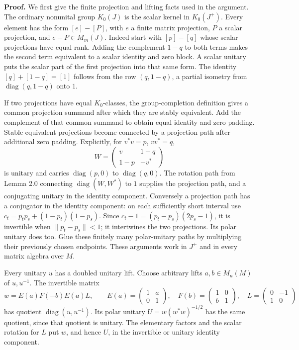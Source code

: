 \documentclass[
  11pt,
]{article}
\begin{document}
\textbf{Proof.} We first give the finite projection and lifting facts
used in the argument. The ordinary nonunital group \(K_0(J)\) is the
scalar kernel in \(K_0(J^+)\). Every element has the form \([e]-[P]\),
with \(e\) a finite matrix projection, \(P\) a scalar projection, and
\(e-P\in M_m(J)\). Indeed start with \([p]-[q]\) whose scalar
projections have equal rank. Adding the complement \(1-q\) to both terms
makes the second term equivalent to a scalar identity and zero block. A
scalar unitary puts the scalar part of the first projection into that
same form. The identity \([q]+[1-q]=[1]\) follows from the row
\((q,1-q)\), a partial isometry from \(\operatorname{diag}(q,1-q)\) onto
\(1\).

If two projections have equal \(K_0\)-classes, the group-completion
definition gives a common projection summand after which they are stably
equivalent. Add the complement of that common summand to obtain equal
identity and zero padding. Stable equivalent projections become
connected by a projection path after additional zero padding.
Explicitly, for \(v^*v=p\), \(vv^*=q\), \[
W=\begin{pmatrix}v&1-q\\1-p&-v^*\end{pmatrix}
\] is unitary and carries \(\operatorname{diag}(p,0)\) to
\(\operatorname{diag}(q,0)\). The rotation path from Lemma 2.0
connecting \(\operatorname{diag}(W,W^*)\) to \(1\) supplies the
projection path, and a conjugating unitary in the identity component.
Conversely a projection path has a conjugator in the identity component:
on each sufficiently short interval use \(c_t=p_t p_s+(1-p_t)(1-p_s)\).
Since \(c_t-1=(p_t-p_s)(2p_s-1)\), it is invertible when
\(\|p_t-p_s\|<1\); it intertwines the two projections. Its polar unitary
does too. Glue these finitely many polar-unitary paths by multiplying
their previously chosen endpoints. These arguments work in \(J^+\) and
in every matrix algebra over \(M\).

Every unitary \(u\) has a doubled unitary lift. Choose arbitrary lifts
\(a,b\in M_n(M)\) of \(u,u^{-1}\). The invertible matrix \[
w=E(a)F(-b)E(a)L,\qquad
E(a)=\begin{pmatrix}1&a\\0&1\end{pmatrix},\quad
F(b)=\begin{pmatrix}1&0\\b&1\end{pmatrix},\quad
L=\begin{pmatrix}0&-1\\1&0\end{pmatrix}
\] has quotient \(\operatorname{diag}(u,u^{-1})\). Its polar unitary
\(U=w(w^*w)^{-1/2}\) has the same quotient, since that quotient is
unitary. The elementary factors and the scalar rotation for \(L\) put
\(w\), and hence \(U\), in the invertible or unitary identity component.
\end{document}
